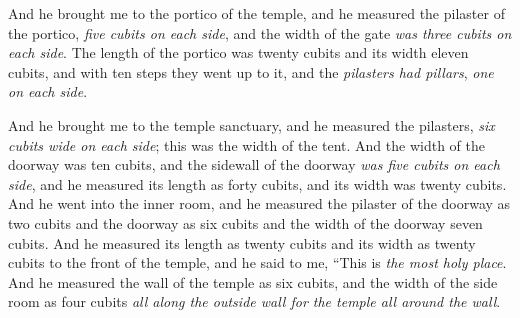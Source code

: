 \begin{biblechapter}
\verse And he brought me to the portico of the temple, and he measured the pilaster of the portico, \textit{five cubits on each side}, and the width of the gate \textit{was three cubits on each side}.
\verse The length of the portico was twenty cubits and its width eleven cubits, and with ten steps they went up to it, and the \textit{pilasters had pillars}, \textit{one on each side}.
\end{biblechapter}

\begin{biblechapter} %
 And he brought me to the temple sanctuary, and he measured the pilasters, \textit{six cubits wide on each side}; this was the width of the tent.
\verse And the width of the doorway was ten cubits, and the sidewall of the doorway \textit{was five cubits on each side}, and he measured its length as forty cubits, and its width was twenty cubits.
\verse And he went into the inner room, and he measured the pilaster of the doorway as two cubits and the doorway as six cubits and the width of the doorway seven cubits.
\verse And he measured its length as twenty cubits and its width as twenty cubits to the front of the temple, and he said to me, “This is \textit{the most holy place}.
\verse And he measured the wall of the temple as six cubits, and the width of the side room as four cubits \textit{all along the outside wall for the temple all around the wall}.

\end{biblechapter}
